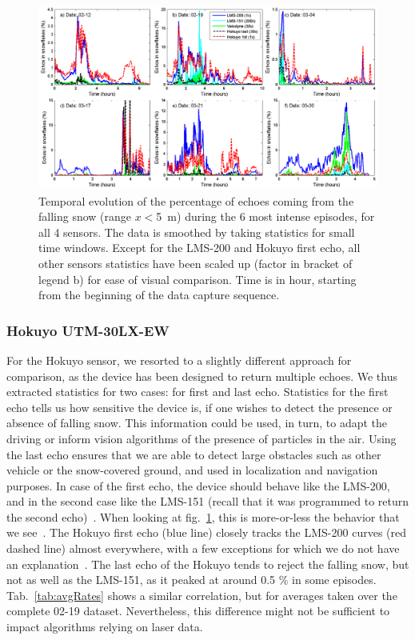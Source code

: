 \begin{figure}[th]
    \centering
    \includegraphics[width=0.98\linewidth]{./img/TimingSnow.png}
    \caption{Temporal evolution of the percentage of echoes coming from the falling snow (range $x<$\SI{5}{\meter}) during the 6 most intense episodes, for all 4 sensors. The data is smoothed by taking statistics for small time windows. Except for the LMS-200 and Hokuyo first echo, all other sensors statistics have been scaled up (factor in bracket of legend b) for ease of visual comparison. Time is in hour, starting from the beginning of the data capture sequence. }
    \label{fig:TimingSnow}
\end{figure}


\subsubsection{Hokuyo UTM-30LX-EW}
For the Hokuyo sensor, we resorted to a slightly different approach for comparison, as the device has been designed to return multiple echoes. We thus extracted statistics for two cases: for first and last echo. Statistics for the first echo tells us how sensitive the device is, if one wishes to detect the presence or absence of falling snow. This information could be used, in turn, to adapt the driving or inform vision algorithms of the presence of particles in the air. Using the last echo ensures that we are able to detect large obstacles such as other vehicle or the snow-covered ground, and used in localization and navigation purposes. In case of the first echo, the device should behave like the LMS-200, and in the second case like the LMS-151 (recall that it was programmed to return the second echo)~. When looking at fig.~\ref{fig:TimingSnow}, this is more-or-less the behavior that we see~. The Hokuyo first echo (blue line) closely tracks the LMS-200 curves (red dashed line) almost everywhere, with a few exceptions for which we do not have an explanation~. The last echo of the Hokuyo tends to reject the falling snow, but not as well as the LMS-151, as it peaked at around 0.5 \% in some episodes. Tab.~\ref{tab:avgRates} shows a similar correlation, but for averages taken over the complete 02-19 dataset. Nevertheless, this difference might not be sufficient to impact algorithms relying on laser data.


